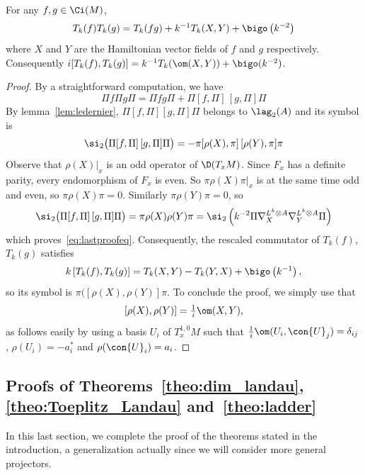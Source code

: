 \begin{prop}\label{prop:subsymbolic}
For any $f,g \in \Ci (M)$,
\begin{gather}\label{eq:lastproofeq}
T_{k} (f) T_k (g) = T_k (fg) + k^{-1} T_k (X,Y) + \bigo \left(k^{-2}\right)
\end{gather}
where $X$ and $Y$ are the Hamiltonian vector fields of $f$ and $g$ respectively. Consequently $ i [T_k (f), T_k (g)] = k^{-1} T_k (\om (X,Y)) + \bigo (k^{-2})$.
\end{prop}
\begin{proof}
By a straightforward computation, we have
\[
\Pi f \Pi g \Pi = \Pi fg \Pi + \Pi [f, \Pi]\,[g, \Pi] \Pi
\]
By lemma~\ref{lem:ledernier}, $\Pi [f, \Pi] [g, \Pi] \Pi$ belongs to $\lag_2 (A)$ and its symbol is
\begin{gather*}
\si_2 \big(\Pi [f, \Pi]\,[g, \Pi] \Pi\big) = - \pi [\rho (X), \pi]\,[\rho (Y),
\pi] \pi
\end{gather*}
Observe that $\rho (X) |_x$ is an odd operator of $\D (T_xM)$. Since $F_x$ has a definite parity, every endomorphism of $F_x$ is even. So $\pi \rho (X)
\pi |_x$ is at the same time odd and even, so $\pi \rho (X) \pi =0$.  Similarly $\pi \rho (Y) \pi =0$, so
\begin{gather*}
\si_2 \big(\Pi [f, \Pi]\,[g, \Pi] \Pi\big) = \pi \rho (X) \rho (Y) \pi = \si_2 \left(k^{-2} \Pi \nabla_X^{L^k \otimes A} \nabla_Y^{L^k \otimes A} \Pi\right)
\end{gather*}
which proves~\eqref{eq:lastproofeq}. Consequently, the rescaled commutator of $T_k(f)$, $T_k(g)$ satisfies
\[
k \left[T_k (f), T_k (g)\right] = T_k (X, Y) - T_k (Y,X) + \bigo \left(k^{-1}\right),
\]
so its symbol is $\pi ([\rho (X), \rho (Y)] \pi$. To conclude the proof, we simply use that
\begin{gather}\label{eq:commutator_rho}
\left[\rho (X), \rho (Y)\right] = \tfrac{1}{i} \om (X,Y),
\end{gather}
as follows easily by using a basis $U_i$ of $T_x^{1,0}M$ such that $\frac{1}{i} \om (U_i, \con{U}_j) = \delta_{ij}$, $\rho (U_i) = - a_i^*$ and $\rho (\con{U}_i) = a_i$.
\end{proof}


\subsection{Proofs of Theorems~\ref{theo:dim_landau}, \ref{theo:Toeplitz_Landau} and~\ref{theo:ladder}} \label{sec:ledernier}

In this last section, we complete the proof of the theorems stated in the introduction, a generalization actually since we will consider more general projectors.

